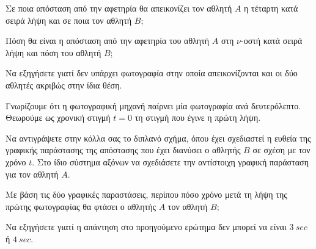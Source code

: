 \begin{alist}
\item Σε ποια απόσταση από την αφετηρία θα απεικονίζει τον αθλητή $A$ η τέταρτη κατά σειρά λήψη και σε ποια τον αθλητή $B$;
\item Πόση θα είναι η απόσταση από την αφετηρία του αθλητή $A$ στη $\nu$-οστή κατά σειρά λήψη και πόση του αθλητή $B$;
\item Να εξηγήσετε γιατί δεν υπάρχει φωτογραφία στην οποία απεικονίζονται και οι δύο αθλητές ακριβώς στην ίδια θέση.
\item Γνωρίζουμε ότι η φωτογραφική μηχανή παίρνει μία φωτογραφία ανά δευτερόλεπτο. Θεωρούμε ως χρονική στιγμή $t = 0$ τη στιγμή που έγινε η πρώτη λήψη.

\begin{rlist}
\item Να αντιγράψετε στην κόλλα σας το διπλανό σχήμα, όπου έχει σχεδιαστεί η ευθεία της γραφικής παράστασης της απόστασης που έχει διανύσει ο αθλητής $B$ σε σχέση με τον χρόνο $t$. Στο ίδιο σύστημα αξόνων να σχεδιάσετε την αντίστοιχη γραφική παράσταση για τον αθλητή $A$.

\begin{center}
\end{center}

\item Με βάση τις δύο γραφικές παραστάσεις, περίπου πόσο χρόνο μετά τη λήψη της πρώτης φωτογραφίας θα φτάσει ο αθλητής $A$ τον αθλητή $B$;
\item Να εξηγήσετε γιατί η απάντηση στο προηγούμενο ερώτημα δεν μπορεί να είναι $3\ \si{sec}$ ή $4\ \si{sec}$.
\end{rlist}
\end{alist}

